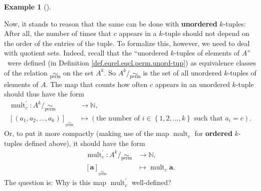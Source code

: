\documentclass[numbers=enddot,12pt,final,onecolumn,notitlepage]{scrartcl}%
\numberwithin{exer}{subsection}
\theoremstyle{definition}
\newtheorem{exam}[theo]{Example}
\newenvironment{example}[1][]
{\begin{exam}[#1]\begin{leftbar}}
{\end{leftbar}\end{exam}}
\newenvironment{fineprint}{\begin{small}}{\end{small}}
\begin{document}
\begin{fineprint}
\begin{example}
Now, it stands to reason that the same can be done with \textbf{unordered}
$k$-tuples: After all, the number of times that $c$ appears in a $k$-tuple
should not depend on the order of the entries of the tuple. To formalize this,
however, we need to deal with quotient sets. Indeed, recall that the
\textquotedblleft unordered $k$-tuples of elements of $A$\textquotedblright%
\ were defined (in Definition \ref{def.eqrel.eqcl.perm.unord-tup}) as
equivalence classes of the relation $\underset{\operatorname*{perm}}{\sim}$ on
the set $A^{k}$. So $A^{k}/\underset{\operatorname*{perm}}{\sim}$ is the set
of all unordered $k$-tuples of elements of $A$. The map that counts how often
$c$ appears in an unordered $k$-tuple should thus have the form%
\begin{align*}
\operatorname*{mult}\nolimits_{c}^{\prime}:\left.  A^{k}%
/\underset{\operatorname*{perm}}{\sim}\right.   &  \rightarrow\mathbb{N},\\
\left[  \left(  a_{1},a_{2},\ldots,a_{k}\right)  \right]
_{\underset{\operatorname*{perm}}{\sim}}  &  \mapsto\left(  \text{the number
of }i\in\left\{  1,2,\ldots,k\right\}  \text{ such that }a_{i}=c\right)  .
\end{align*}
Or, to put it more compactly (making use of the map $\operatorname*{mult}%
\nolimits_{c}$ for \textbf{ordered} $k$-tuples defined above), it should have
the form%
\begin{align*}
\operatorname*{mult}\nolimits_{c}^{\prime}:\left.  A^{k}%
/\underset{\operatorname*{perm}}{\sim}\right.   &  \rightarrow\mathbb{N},\\
\left[  \mathbf{a}\right]  _{\underset{\operatorname*{perm}}{\sim}}  &
\mapsto\operatorname*{mult}\nolimits_{c}\mathbf{a}.
\end{align*}
The question is: Why is this map $\operatorname*{mult}\nolimits_{c}^{\prime}$ well-defined?


\end{example}
\end{fineprint}
\end{document}
